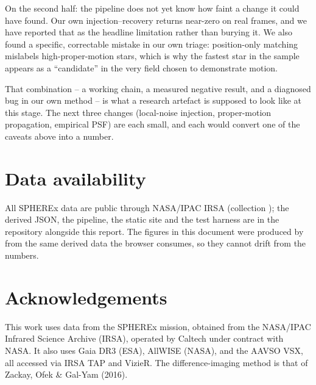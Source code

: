 \documentclass[11pt,a4paper]{article}
\newcommand{\code}[1]{\texttt{\small\detokenize{#1}}}
\begin{document}
On the second half: the pipeline does not yet know how faint a change it could have found. Our own
injection--recovery returns near-zero on real frames, and we have reported that as the headline
limitation rather than burying it. We also found a specific, correctable mistake in our own triage:
position-only matching mislabels high-proper-motion stars, which is why the fastest star in the sample
appears as a ``candidate'' in the very field chosen to demonstrate motion.

That combination -- a working chain, a measured negative result, and a diagnosed bug in our own
method -- is what a research artefact is supposed to look like at this stage. The next three
changes (local-noise injection, proper-motion propagation, empirical PSF) are each small, and each
would convert one of the caveats above into a number.

\section*{Data availability}
All SPHEREx data are public through NASA/IPAC IRSA (collection \code{spherex_qr2}); the derived JSON,
the pipeline, the static site and the test harness are in the repository alongside this report. The
figures in this document were produced by \code{make\_figures.py} from the same derived data the
browser consumes, so they cannot drift from the numbers.

\section*{Acknowledgements}
This work uses data from the SPHEREx mission, obtained from the NASA/IPAC Infrared Science Archive
(IRSA), operated by Caltech under contract with NASA. It also uses Gaia DR3 (ESA), AllWISE (NASA),
and the AAVSO VSX, all accessed via IRSA TAP and VizieR. The difference-imaging method is that of
Zackay, Ofek \& Gal-Yam (2016).
\end{document}
